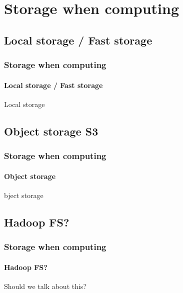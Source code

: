 \documentclass[aspectratio=169,usenames,dvipsnames]{beamer}
\begin{document}
\section{Storage when computing}
    \subsection{Local storage / Fast storage}
    \begin{frame}
        \frametitle{Storage when computing}
        \framesubtitle{Local storage / Fast storage}
        \begin{block}{Local storage}
        \end{block}
    \end{frame}
    \subsection{Object storage S3}
    \begin{frame}
        \frametitle{Storage when computing}
        \framesubtitle{Object storage}
        \begin{block}{bject storage}
        \end{block}
    \end{frame}
    \subsection{Hadoop FS?}
    \begin{frame}
        \frametitle{Storage when computing}
        \framesubtitle{Hadoop FS?}
        \begin{block}{Should we talk about this?}
        \end{block}
    \end{frame}
\end{document}
